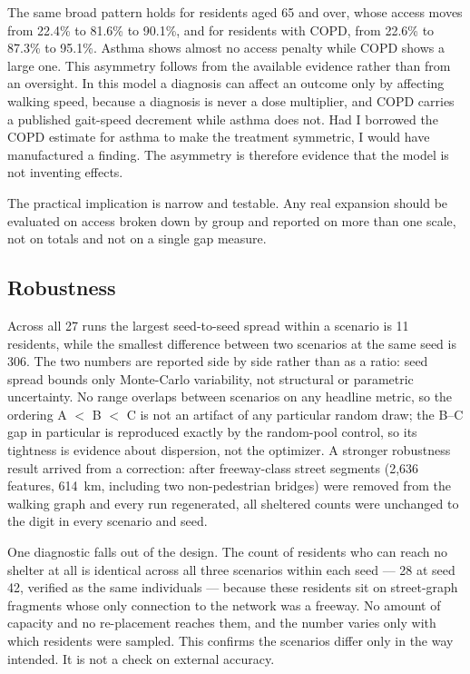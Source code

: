 \documentclass[graybox]{svmult}
\begin{document}
The same broad pattern holds for residents aged 65 and over, whose access moves
from 22.4\% to 81.6\% to 90.1\%, and for residents with COPD, from 22.6\% to
87.3\% to 95.1\%. Asthma shows almost no access penalty while COPD shows a large
one. This asymmetry follows from the available evidence rather than from an
oversight. In this model a diagnosis can affect an outcome only by affecting
walking speed, because a diagnosis is never a dose multiplier, and COPD carries a
published gait-speed decrement while asthma does not. Had I borrowed the COPD
estimate for asthma to make the treatment symmetric, I would have manufactured a
finding. The asymmetry is therefore evidence that the model is not inventing
effects.

The practical implication is narrow and testable. Any real expansion should be
evaluated on access broken down by group and reported on more than one scale, not
on totals and not on a single gap measure.

\subsection{Robustness}
\label{sec:robustness}

Across all 27 runs the largest seed-to-seed spread within a scenario is 11
residents, while the smallest difference between two scenarios at the same seed
is 306. The two numbers are reported side by side rather than as a ratio: seed
spread bounds only Monte-Carlo variability, not structural or parametric
uncertainty. No range overlaps between scenarios on any headline metric, so the
ordering A $<$ B $<$ C is not an artifact of any particular random draw; the
B--C gap in particular is reproduced exactly by the random-pool control, so its
tightness is evidence about dispersion, not the optimizer. A stronger
robustness result arrived from a correction: after freeway-class street
segments (2,636 features, 614~km, including two non-pedestrian bridges) were
removed from the walking graph and every run regenerated, all sheltered counts
were unchanged to the digit in every scenario and seed.

One diagnostic falls out of the design. The count of residents who can reach no
shelter at all is identical across all three scenarios within each seed --- 28
at seed 42, verified as the same individuals --- because these residents sit on
street-graph fragments whose only connection to the network was a freeway.
No amount of capacity and no re-placement reaches them, and the number varies
only with which residents were sampled. This confirms the scenarios differ only
in the way intended. It is not a check on external accuracy.
\end{document}
